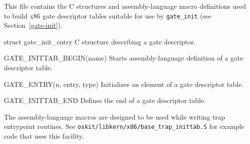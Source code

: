 \label{gate-init-h}
\begin{apisyn}
\end{apisyn}
\begin{apidesc}
	This file contains the C structures and assembly-language macro
	definitions used to build x86 gate descriptor tables suitable for
	use by {\tt gate_init} (see Section~\ref{gate-init}).
	\begin{csymlist}
	\item[struct gate_init_entry]
		C structure describing a gate descriptor.
	\item[GATE_INITTAB_BEGIN(name)]
		Starts assembly-language definition of a gate descriptor table.
	\item[GATE_ENTRY(n, entry, type)]
		Initializes an element of a gate descriptor table.
	\item[GATE_INITTAB_END]
		Defines the end of a gate descriptor table.
	\end{csymlist}
	The assembly-language macros are designed to be used while writing
	trap entrypoint routines.
	See {\tt oskit/libkern/x86/base_trap_inittab.S}
	for example code that uses this facility.
\end{apidesc}

